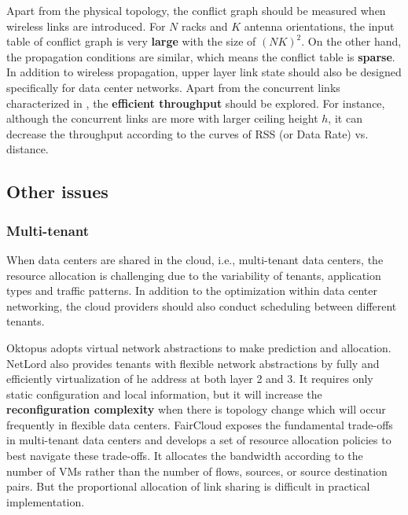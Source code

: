 \documentclass[journal,onecolumn,11pt]{IEEEtran}
\begin{document}
Apart from the physical topology, the conflict graph should be measured when wireless links are introduced. For $N$ racks and $K$ antenna orientations, the input table of conflict graph is very \textbf{large} with the size of $(NK)^2$. On the other hand, the propagation conditions are similar, which means the conflict table is \textbf{sparse}. In addition to wireless propagation, upper layer link state should also be designed specifically for data center networks. Apart from the concurrent links characterized in \cite{Zhou:2012:MMC:2342356.2342440}, the \textbf{efficient throughput} should be explored. For instance, although the concurrent links are more with larger ceiling height $h$, it can decrease the throughput according to the curves of RSS (or Data Rate) vs. distance.


\subsection{Other issues}

\subsubsection{Multi-tenant}

When data centers are shared in the cloud, i.e., multi-tenant data centers, the resource allocation is challenging due to the variability of tenants, application types and traffic patterns. In addition to the optimization within data center networking, the cloud providers should also conduct scheduling between different tenants.

Oktopus \cite{Ballani:2011:TPD:2018436.2018465} adopts virtual network abstractions to make prediction and allocation. NetLord \cite{Mudigonda:2011:NSM:2018436.2018444} also provides tenants with flexible network abstractions by fully and efficiently virtualization of he address at both layer 2 and 3. It requires only static configuration and local information, but it will increase the \textbf{reconfiguration complexity} when there is topology change which will occur frequently in flexible data centers. FairCloud \cite{Popa:2011:FSN:2070562.2070584} exposes the fundamental trade-offs in multi-tenant data centers and develops a set of resource allocation policies to best navigate these trade-offs. It allocates the bandwidth according to the number of VMs rather than the number of flows, sources, or source destination pairs. But the proportional allocation of link sharing is difficult in practical implementation.
\end{document}
